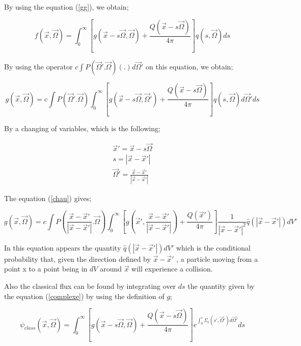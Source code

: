 \documentclass[a4paper, 12pt]{report}
\begin{document}
By using the equation (\ref{gg}), we obtain;

\begin{equation}
f(\vec{x},\vec{\Omega}) = \int_0^\infty \left[  g(\vec{x}-s\vec{\Omega},\vec{\Omega}) + \frac{Q(\vec{x}-s\vec{\Omega})}{4\pi} \right] q(s,\vec{\Omega})ds
\end{equation}

By using the operator $ c \int P(\vec{\Omega}'.\vec{\Omega})(.) d\vec{\Omega}'$ on this equation, we obtain;

\begin{equation}\label{chau}
g(\vec{x},\vec{\Omega}) = c \int P(\vec{\Omega}'.\vec{\Omega}) \int_0^\infty \left[  g(\vec{x}-s\vec{\Omega},\vec{\Omega}') + \frac{Q(\vec{x}-s\vec{\Omega})}{4\pi} \right] q(s,\vec{\Omega})d\vec{\Omega}'ds
\end{equation}

By a changing of variables, which is the following;

\begin{align}\label{change}
\vec{x}' = \vec{x}-s\vec{\Omega} \\
s = |\vec{x}-\vec{x}'| \\
\vec{\Omega}' = \frac{\vec{x}-\vec{x}'}{|\vec{x}-\vec{x}'|}
\end{align}

The equation (\ref{chau}) gives;

\begin{equation}\label{impossible}
g(\vec{x},\vec{\Omega}) = c \int P\left(\frac{\vec{x}-\vec{x}'}{|\vec{x}-\vec{x}'|}.\vec{\Omega}\right) \int_0^\infty \left[  g\left(\vec{x}',\frac{\vec{x}-\vec{x}'}{|\vec{x}-\vec{x}'|}\right) + \frac{Q(\vec{x}')}{4\pi} \right] \frac{1}{|\vec{x}-\vec{x}'|^2}\hat{q}(|\vec{x}-\vec{x}'|)dV'
\end{equation}

In this equation appears the quantity $\hat{q}(|\vec{x}-\vec{x}'|)dV'$ which is the conditional probability that, given the direction defined by $\vec{x}-\vec{x}'$ , a particle moving from a point x to a point being in $dV$ around $\vec{x}$ will experience a collision.

Also the classical flux can be found by integrating over $ds$ the quantity given by the equation (\ref{complexe}) by using the definition of $g$;

\begin{equation}
\psi_{class}(\vec{x},\vec{\Omega}) = \int_0^\infty \left[ g(\vec{x}-s\vec{\Omega},\vec{\Omega}) + \frac{Q(\vec{x}-s\vec{\Omega})}{4\pi} \right] e^{\int_0^s \Sigma_t(s',\vec{\Omega}')d\vec{\Omega}'}ds
\end{equation}
\end{document}
